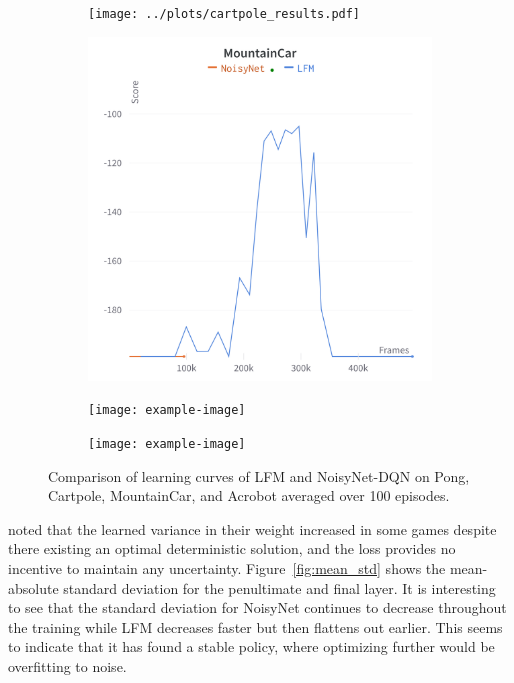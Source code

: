 \documentclass[]{uai2022} %
\begin{document}
\begin{figure}
    \centering
    \begin{subfigure}[b]{0.45\columnwidth}
        \centering
        \texttt{[image: ../plots/cartpole\_results.pdf]}
    \end{subfigure}
    \begin{subfigure}[b]{0.45\columnwidth}
        \centering
        \includegraphics[width=\columnwidth]{charts/MountainCar_score}
    \end{subfigure}
    \begin{subfigure}[b]{0.45\columnwidth}
        \centering
        \texttt{[image: example-image]}
    \end{subfigure}
    \begin{subfigure}[b]{0.45\columnwidth}
        \centering
        \texttt{[image: example-image]}
    \end{subfigure}
    \caption{Comparison of learning curves of LFM and NoisyNet-DQN on
    Pong, Cartpole, MountainCar, and Acrobot averaged over 100 episodes.}
    \label{fig:training_curves}
\end{figure}

\cite{fortunato_noisy_2019} noted that the learned variance in their weight increased
in some games despite there existing an optimal deterministic solution, and the loss
provides no incentive to maintain any uncertainty. Figure~\ref{fig:mean_std} shows
the mean-absolute standard deviation for the penultimate and final layer. It is 
interesting to see that the standard deviation for NoisyNet continues to decrease
throughout the training while LFM decreases faster but then flattens out earlier.
This seems to indicate that it has found a stable policy, where optimizing further would
be overfitting to noise.
\end{document}
